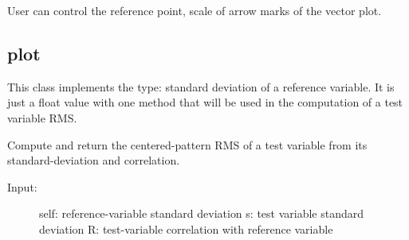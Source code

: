 \documentclass[letterpaper,10pt,english]{sphinxmanual}
\begin{document}
User can control the reference point, scale of arrow marks of the vector plot.


\subsection{plot}
\label{diagnosisutils:plot}\label{diagnosisutils:module-plot}

\begin{fulllineitems}
\label{diagnosisutils:plot.reference_std_dev}
This class implements the type: standard deviation of a reference variable.
It is just a float value with one method that will be used in the computation of
a test variable RMS.

\begin{fulllineitems}
\label{diagnosisutils:plot.reference_std_dev.compute_RMS_function}
Compute and return the centered-pattern RMS of a test variable
from its standard-deviation and correlation.
\begin{description}
\item[{Input:}] \leavevmode
self:   reference-variable standard deviation
s:      test variable standard deviation
R:      test-variable correlation with reference variable

\end{description}

\end{fulllineitems}


\end{fulllineitems}

\end{document}
